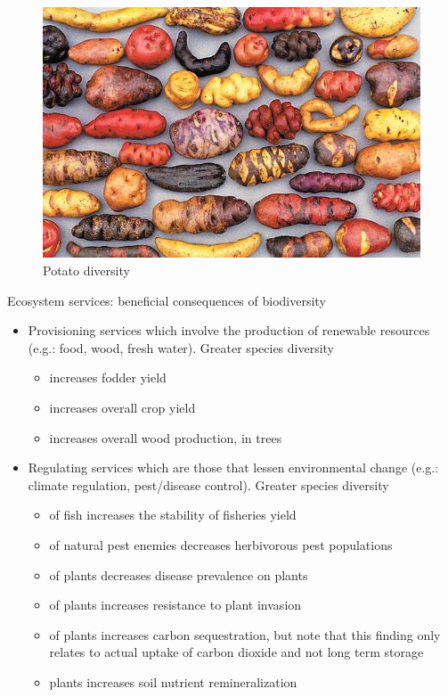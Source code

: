 \documentclass[
  ignorenonframetext,
  aspectratio=169]{beamer}
\providecommand{\tightlist}{%
  \setlength{\itemsep}{0pt}\setlength{\parskip}{0pt}}
\begin{document}
\begin{frame}{}
\protect\hypertarget{section-6}{}
\begin{figure}
\includegraphics[width=0.7\linewidth]{./../images/twttr/potato_diversity_D7N0aiUXYAIXcLq} \caption{Potato diversity}\label{fig:potato-diversity}
\end{figure}
\end{frame}

\begin{frame}{Ecosystem services: beneficial consequences of
biodiversity}
\protect\hypertarget{ecosystem-services-beneficial-consequences-of-biodiversity}{}
\begin{itemize}
\tightlist
\item
  Provisioning services which involve the production of renewable
  resources (e.g.: food, wood, fresh water). Greater species diversity

  \begin{itemize}
  \tightlist
  \item
    increases fodder yield
  \item
    increases overall crop yield
  \item
    increases overall wood production, in trees
  \end{itemize}
\item
  Regulating services which are those that lessen environmental change
  (e.g.: climate regulation, pest/disease control). Greater species
  diversity

  \begin{itemize}
  \tightlist
  \item
    of fish increases the stability of fisheries yield
  \item
    of natural pest enemies decreases herbivorous pest populations
  \item
    of plants decreases disease prevalence on plants
  \item
    of plants increases resistance to plant invasion
  \item
    of plants increases carbon sequestration, but note that this finding
    only relates to actual uptake of carbon dioxide and not long term
    storage
  \item
    plants increases soil nutrient remineralization
  \end{itemize}
\end{itemize}
\end{frame}
\end{document}
